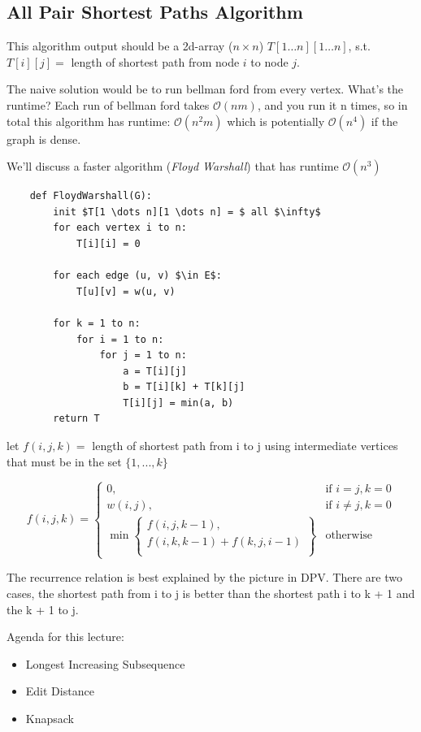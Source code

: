 \documentclass[12pt]{article}
\renewcommand{\O}{\mathcal{O}}
\begin{document}
\subsection{All Pair Shortest Paths Algorithm}
This algorithm output should be a 2d-array ($n \times n$) $T[1\dots n][1 \dots n]$, s.t. $T[i][j] = $ length of shortest path from node $i$ to node $j$.

The naive solution would be to run bellman ford from every vertex. What's the runtime? Each run of bellman ford takes $\O(nm)$, and you run it n times, so in total this algorithm has runtime: $\O(n^2m)$ which is potentially $\O(n^4)$ if the graph is dense.

We'll discuss a faster algorithm (\emph{Floyd Warshall}) that has runtime $\O(n^3)$

\begin{lstlisting}
    def FloydWarshall(G):
        init $T[1 \dots n][1 \dots n] = $ all $\infty$
        for each vertex i to n:
            T[i][i] = 0

        for each edge (u, v) $\in E$:
            T[u][v] = w(u, v)

        for k = 1 to n:
            for i = 1 to n:
                for j = 1 to n:
                    a = T[i][j]
                    b = T[i][k] + T[k][j]
                    T[i][j] = min(a, b)
        return T
\end{lstlisting}

let $f(i, j, k) = $ length of shortest path from i to j using intermediate vertices that must be in the set $\lbrace1, ..., k \rbrace$

$$f(i, j, k) =
    \begin{cases}
        0,       & \text{if } i = j, k = 0    \\
        w(i, j), & \text{if } i \neq j, k = 0 \\
        \min \left\{
        \begin{array}{c}
            f(i,j,k-1),             \\
            f(i,k,k-1) + f(k,j,i-1) \\
        \end{array}
        \right\} & \text{otherwise }
    \end{cases}$$

The recurrence relation is best explained by the picture in DPV. There are two cases, the shortest path from i to j is better than the shortest path i to k + 1 and the k + 1 to j.


Agenda for this lecture:
\begin{itemize}
    \item Longest Increasing Subsequence
    \item Edit Distance
    \item Knapsack
\end{itemize}
\end{document}
